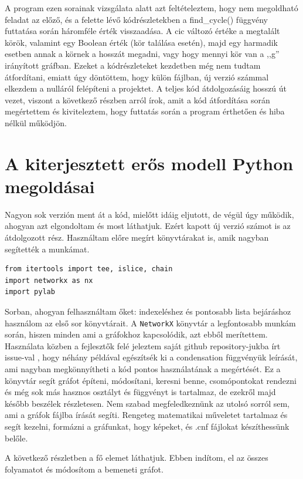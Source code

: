 \documentclass[
]{thesis-ekf}
\theoremstyle{definition}
\theoremstyle{remark}
\begin{document}
	A program ezen sorainak vizsgálata alatt azt feltételeztem, hogy nem megoldható feladat az előző, és a felette lévő kódrészletekben a find\_cycle() függvény futtatása során háromféle érték visszaadása. A cic változó értéke a megtalált körök, valamint egy Boolean érték (kör találása esetén), majd egy harmadik esetben annak a körnek a hosszát megadni, vagy hogy mennyi kör van a ,,g'' irányított gráfban. Ezeket a kódrészleteket kezdetben még nem tudtam átfordítani, emiatt úgy döntöttem, hogy külön fájlban, új verzió számmal elkezdem a nulláról felépíteni a projektet. A teljes kód átdolgozásáig hosszú út vezet, viszont a következő részben arról írok, amit a kód átfordítása során megértettem és kiviteleztem, hogy futtatás során a program érthetően és hiba nélkül működjön.
	
	\section{A kiterjesztett erős modell Python megoldásai}
	
	Nagyon sok verzión ment át a kód, mielőtt idáig eljutott, de végül úgy működik, ahogyan azt elgondoltam és most láthatjuk. Ezért kapott új verzió számot is az átdolgozott rész. Használtam előre megírt könyvtárakat is, amik nagyban segítették a munkámat.

	\begin{lstlisting}
from itertools import tee, islice, chain
import networkx as nx
import pylab
	\end{lstlisting}

	Sorban, ahogyan felhasználtam őket: indexeléshez és pontosabb lista bejáráshoz használom az első sor könyvtárait. A \texttt{NetworkX} könyvtár a legfontosabb munkám során, hiszen minden ami a gráfokhoz kapcsolódik, azt ebből merítettem. Használata közben a fejlesztők felé jeleztem saját github repository-jukba írt issue-val \cite{link-github-issue}, hogy néhány példával egészítsék ki a condensation függvényük leírását, ami nagyban megkönnyítheti a kód pontos használatának a megértését. Ez a könyvtár segít gráfot építeni, módosítani, keresni benne, csomópontokat rendezni és még sok más hasznos osztályt és függvényt is tartalmaz, de ezekről majd később beszélek részletesen. Nem szabad megfeledkeznünk az utolsó sorról sem, ami a gráfok fájlba írását segíti. Rengeteg matematikai műveletet tartalmaz és segít kezelni, formázni a gráfunkat, hogy képeket, és .cnf fájlokat készíthessünk belőle.
	
	A következő részletben a fő elemet láthatjuk. Ebben indítom, el az összes folyamatot és módosítom a bemeneti gráfot.
	
\end{document}
